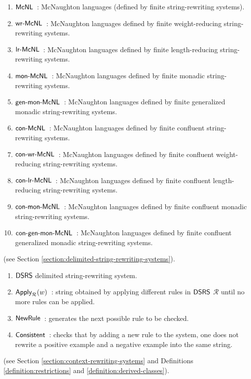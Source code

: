 \begin{enumerate}[]
\item ${\sf McNL}$\ : McNaughton languages (defined by finite string-rewriting systems).
\item $\textup{\sf wr-McNL}$\ : McNaughton languages defined by finite weight-reducing string-rewriting systems.
\item $\textup{\sf lr-McNL}$\ : McNaughton languages defined by finite length-reducing string-rewriting systems.
\item $\textup{\sf mon-McNL}$\ : McNaughton languages defined by finite monadic string-rewriting systems.
\item $\textup{\sf gen-mon-McNL}$\ : McNaughton languages defined by finite generalized monadic string-rewriting systems.
\item $\textup{\sf con-McNL}$\ : McNaughton languages defined by finite confluent string-rewriting systems.
\item $\textup{\sf con-wr-McNL}$\ : McNaughton languages defined by finite confluent weight-reducing string-rewriting systems.
\item $\textup{\sf con-lr-McNL}$\ : McNaughton languages defined by finite confluent length-reducing string-rewriting systems.
\item $\textup{\sf con-mon-McNL}$\ : McNaughton languages defined by finite confluent monadic string-rewriting systems.
\item $\textup{\sf con-gen-mon-McNL}$\ : McNaughton languages defined by finite confluent generalized monadic string-rewriting systems.
\end{enumerate}

 (see Section \ref{section:delimited-string-rewriting-systems}).

\begin{enumerate}[]
\item $\textup{\sf DSRS}$ delimited string-rewriting system.
\item $\textup{\sf Apply}_{\mathcal{R}}(w)$\ : string obtained by applying different rules in $\textup{\sf DSRS}$ $\mathcal{R}$ until no more rules can be applied.
\item $\textup{\sf NewRule}$\ : generates the next possible rule to be checked.
\item $\textup{\sf Consistent}$\ : checks that by adding a new rule to the system, one does not rewrite a positive example and a negative example into the same string.
\end{enumerate}

 (see Section \ref{section:context-rewriting-systems} and Definitions \ref{definition:restrictions} and \ref{definition:derived-classes}).

